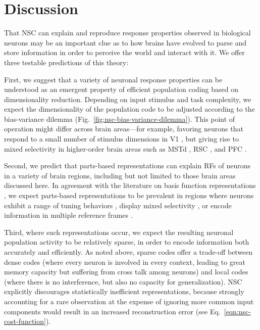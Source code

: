 \section*{Discussion}
\label{sec:discussion}

That \ac{NSC} can explain and reproduce response properties observed in biological neurons may be an important clue as to how brains have evolved to parse and store information
in order to perceive the world and interact with it.
We offer three testable predictions of this theory:

First, we suggest that a variety of neuronal response properties
can be understood as an emergent property of efficient population coding 
based on dimensionality reduction.
Depending on input stimulus and task complexity,
we expect the dimensionality of the population code to be adjusted
according to the bias-variance dilemma
(Fig.~\ref{fig:nsc-bias-variance-dilemma}).
This point of operation might differ across brain areas---for example,
favoring neurons that respond to a small number of stimulus dimensions
in \ac{V1} \cite{OlshausenField1996},
but giving rise to mixed selectivity in higher-order brain areas
such as \ac{MSTd} \cite{Beyeler2016},
\ac{RSC} \cite{Rounds2016,Rounds2018},
and \ac{PFC} \cite{Mante2013}.

Second, we predict that parts-based representations can explain
\acp{RF} of neurons in a variety of brain regions,
including but not limited to those brain areas discussed here. 
In agreement with the literature on basis function representations
\cite{PougetSejnowski1997,PougetSnyder2000,Poggio1990},
we expect parts-based representations
to be prevalent in regions where neurons
exhibit a range of tuning behaviors \cite{Beyeler2016},
display mixed selectivity \cite{Fusi2016,Eichenbaum2017},
or encode information in multiple reference frames \cite{AlexanderNitz2015,Rounds2016,Rounds2018}.

Third, where such representations occur, we expect the resulting
neuronal population activity to be relatively sparse,
in order to encode information both accurately and efficiently.
As noted above,
sparse codes offer a trade-off between 
dense codes (where every neuron is involved in every context,
leading to great memory capacity but suffering from cross talk among neurons)
and local codes (where there is no interference, 
but also no capacity for generalization).
\ac{NSC} explicitly discourages statistically inefficient representations,
because strongly accounting for a rare observation at the expense of ignoring
more common input components would result in an increased reconstruction error
(see Eq.~\ref{eqn:nsc-cost-function}).



